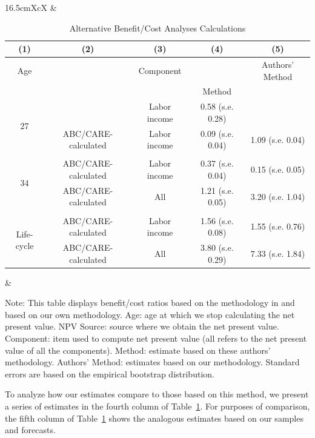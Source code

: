 \begin{table}[!htpb]
\begin{threeparttable}
\caption{Alternative Benefit/Cost Analyses Calculations}
\label{table:comparing}
\centering
\footnotesize
\begin{tabularx}{16.5cm}{XcX}
& \begin{tabular}{ccccc}
\toprule
(1) & (2) & (3) & (4) & (5)\\ \midrule
Age & \mc{1}{c}{NPV Source} & Component & \citet{Kline_Walters_2016_QJE} & Authors' Method \\
& & & Method & \\ \midrule
\multirow{2}{*}{27} & \cite{Chetty_Friedman_etal_2011_QJoE} & Labor income & 0.58 (s.e. 0.28) &  \\
& ABC/CARE-calculated & Labor income & 0.09 (s.e. 0.04) &  1.09 (s.e. 0.04)\\ \\
\multirow{2}{*}{34} & ABC/CARE-calculated & Labor income & 0.37 (s.e. 0.04) & 0.15 (s.e. 0.05) \\
& ABC/CARE-calculated & All & 1.21 (s.e. 0.05) &  3.20 (s.e. 1.04) \\ \\
\multirow{2}{*}{Life-cycle} &  ABC/CARE-calculated & Labor income & 1.56 (s.e. 0.08) & 1.55 (s.e. 0.76) \\
& ABC/CARE-calculated & All & 3.80 (s.e. 0.29) & 7.33 (s.e. 1.84) \\
\bottomrule
\end{tabular}
&
\end{tabularx}
\begin{tablenotes}
\footnotesize
\item Note: This table displays benefit/cost ratios based on the methodology in \citet{Kline_Walters_2016_QJE} and based on our own methodology. Age: age at which we stop calculating the net present value. NPV Source: source where we obtain the net present value. Component: item used to compute net present value (all refers to the net present value of all the components). \citet{Kline_Walters_2016_QJE} Method: estimate based on these authors' methodology. Authors' Method: estimates based on our methodology. Standard errors are based on the empirical bootstrap distribution.
\end{tablenotes}
\end{threeparttable}
\end{table}

To analyze how our estimates compare to those based on this method, we present a series of estimates in the fourth column of Table~\ref{table:comparing}. For purposes of comparison, the fifth column of Table~\ref{table:comparing} shows the analogous estimates based on our samples and forecasts.

